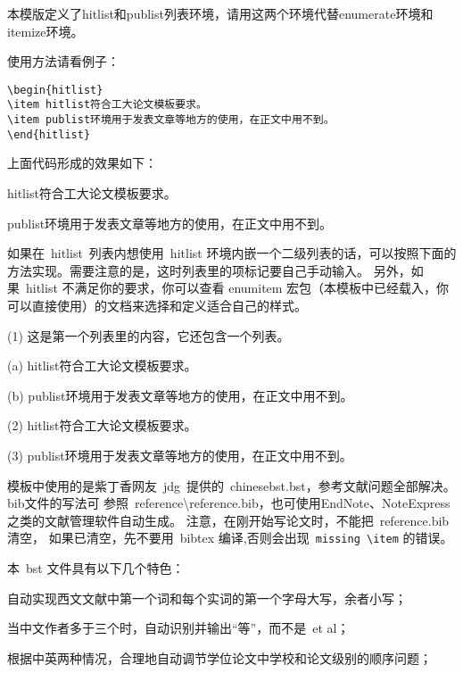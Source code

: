 
本模版定义了hitlist和publist列表环境，请用这两个环境代替enumerate环境和itemize环境。

使用方法请看例子：
\begin{verbatim}
\begin{hitlist}
\item hitlist符合工大论文模板要求。
\item publist环境用于发表文章等地方的使用，在正文中用不到。
\end{hitlist}
\end{verbatim}

上面代码形成的效果如下：
\begin{hitlist}
\item hitlist符合工大论文模板要求。
\item publist环境用于发表文章等地方的使用，在正文中用不到。
\end{hitlist}

如果在~hitlist~列表内想使用~hitlist
环境内嵌一个二级列表的话，可以按照下面的方法实现。需要注意的是，这时列表里的项标记要自己手动输入。
另外，如果~hitlist 不满足你的要求，你可以查看 enumitem
宏包（本模板中已经载入，你可以直接使用）的文档来选择和定义适合自己的样式。
\begin{hitlist}
\item[(1)] 这是第一个列表里的内容，它还包含一个列表。
\begin{hitlist}
\item[(a)] hitlist符合工大论文模板要求。
\item[(b)] publist环境用于发表文章等地方的使用，在正文中用不到。
\end{hitlist}
\item[(2)] hitlist符合工大论文模板要求。
\item[(3)] publist环境用于发表文章等地方的使用，在正文中用不到。
\end{hitlist}


模板中使用的是紫丁香网友~jdg~提供的~chinesebst.bst，参考文献问题全部解决。bib文件的写法可
参照~reference\textbackslash reference.bib，也可使用EndNote、NoteExpress之类的文献管理软件自动生成。
注意，在刚开始写论文时，不能把~reference.bib 清空，
如果已清空，先不要用~bibtex 编译,否则会出现~\verb|missing \item| 的错误。

本~bst 文件具有以下几个特色：
\begin{hitlist}
  \item 自动实现西文文献中第一个词和每个实词的第一个字母大写，余者小写；
  \item 当中文作者多于三个时，自动识别并输出“等”，而不是~et al；
  \item 根据中英两种情况，合理地自动调节学位论文中学校和论文级别的顺序问题；
\end{hitlist}


